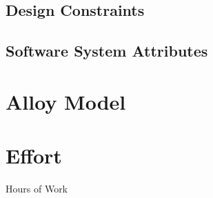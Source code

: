 \documentclass[12pt, a4paper]{report}
\begin{document}
\section{Design Constraints}


\section{Software System Attributes}


\chapter{Alloy Model}
\label{ch:alloy}



\chapter{Effort}
\label{ch:effort}

Hours of Work



%

%
\end{document}
